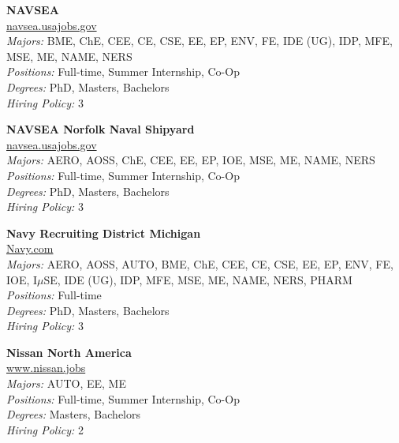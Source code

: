 \documentclass{article}
\begin{document}
\begin{center}
\begin{multicols}{3}
\begin{minipage}{.9\columnwidth}{\Large\bf NAVSEA }\\
	\url{navsea.usajobs.gov}\\
	\emph{Majors:} BME, ChE, CEE, CE, CSE, EE, EP, ENV, FE, IDE (UG), IDP, MFE, MSE, ME, NAME, NERS\\
	\emph{Positions:} Full-time, Summer Internship, Co-Op\\
	\emph{Degrees:} PhD, Masters, Bachelors\\
	\emph{Hiring Policy:} 3\\
\end{minipage}
 
\begin{minipage}{.9\columnwidth}{\Large\bf NAVSEA Norfolk Naval Shipyard }\\
	\url{navsea.usajobs.gov}\\
	\emph{Majors:} AERO, AOSS, ChE, CEE, EE, EP, IOE, MSE, ME, NAME, NERS\\
	\emph{Positions:} Full-time, Summer Internship, Co-Op\\
	\emph{Degrees:} PhD, Masters, Bachelors\\
	\emph{Hiring Policy:} 3\\
\end{minipage}
 
\begin{minipage}{.9\columnwidth}{\Large\bf Navy Recruiting District Michigan }\\
	\url{Navy.com}\\
	\emph{Majors:} AERO, AOSS, AUTO, BME, ChE, CEE, CE, CSE, EE, EP, ENV, FE, IOE, I$\mu$SE, IDE (UG), IDP, MFE, MSE, ME, NAME, NERS, PHARM\\
	\emph{Positions:} Full-time\\
	\emph{Degrees:} PhD, Masters, Bachelors\\
	\emph{Hiring Policy:} 3\\
\end{minipage}
 
\begin{minipage}{.9\columnwidth}{\Large\bf Nissan North America }\\
	\url{www.nissan.jobs}\\
	\emph{Majors:} AUTO, EE, ME\\
	\emph{Positions:} Full-time, Summer Internship, Co-Op\\
	\emph{Degrees:} Masters, Bachelors\\
	\emph{Hiring Policy:} 2\\
\end{minipage}
 

\end{multicols}
\end{center}
\end{document}
